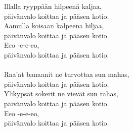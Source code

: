 
Illalla ryyppään hilpeenä kaljaa, \\ päivänvalo koittaa ja pääsen kotio. \\ Aamulla koisaan kalpeena hiljaa, \\ päivänvalo koittaa ja pääsen kotio. \\ Eeo -e-e-eo, \\ päivänvalo koittaa ja pääsen kotio. \\ \hspace{10mm} \\ Raa'at banaanit ne turvottaa sun mahas, \\ päivänvalo koittaa ja pääsen kotio. \\ Ylikypsät sokerit ne vievät sun rahas, \\ päivänvalo koittaa ja pääsen kotio. \\ Eeo -e-e-eo, \\ päivänvalo koittaa ja pääsen kotio.
